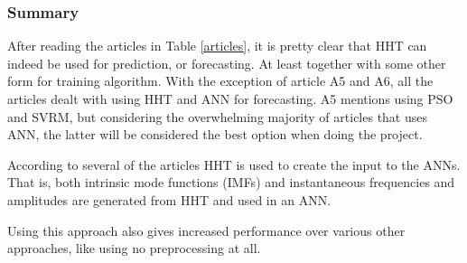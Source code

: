 \begin{description}
\end{description}




\subsubsection{Summary}
\label{summary}

After reading the articles in Table \ref{articles}, it is pretty clear that HHT can indeed be used for prediction, or forecasting. At least together with some other form for training algorithm. With the exception of article A5 and A6, all the articles dealt with using HHT and ANN for forecasting. A5 mentions using PSO and SVRM, but considering the overwhelming majority of articles that uses ANN, the latter will be considered the best option when doing the project. 

According to several of the articles HHT is used to create the input to the ANNs. That is, both intrinsic mode functions (IMFs) and instantaneous frequencies and amplitudes are generated from HHT and used in an ANN. 

Using this approach also gives increased performance over various other approaches, like using no preprocessing at all.


%
%


%


